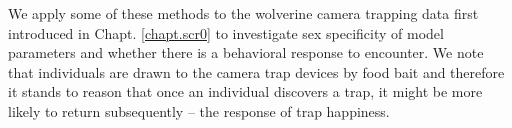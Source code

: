 We apply some of these methods to the wolverine camera trapping
data first introduced in Chapt. \ref{chapt.scr0}
to investigate sex specificity of model parameters and whether
there is a behavioral response to encounter. We note that individuals
are drawn to the camera trap devices by food bait and therefore it
stands to reason that once an individual discovers a trap, it  might
be more likely to return subsequently -- the response of
trap happiness.



\begin{comment}
A basic problem with these two objectives of model selection and model
assessment is their simultaneous use implies a kind of contradiction
which we call the {\it model selectors paradox}: Inferences are always
achieved using standard paradigms of parametric inference (Bayesian or
frequentist) which asssert that the model is properly specified. That
is, we assume that the model is truth. This is paradoxical because we
all know that ``all models are wrong'' but, possibly, ``some are
useful.'' In fact, the notion that an ``assumption'' could even be
correct is itself something of an oxymoron.
\end{comment}
\begin{comment}
  Therefore we don't expect
or hope to make assumptions that are ``correct'' in any way. Gelman
and Shalizi (2010) say it this way: ``there is general agreement that,
in this domain, all models in use are wrong -- not just merely
falsifiable, but actually false.''  We should therefore refrain from
over-stating the relevance of any model.  [not sure where I was going
with this point]
\end{comment}



\begin{comment}
A few specific questions to resolve:
\begin{itemize}
\item[(1)]  Can AIC or DIC choose among detection models and does it matter?
\item[(2)]  Can AIC or DIC choose among more substantial models?  We should
 assume it does. Can we rig up a test?  Suggest: (1) trap level
 covariate and trying DIC; (2) Model Mb vs. not
\item[(3)] Simultaneous to above, see if we can do that.......
Posterior model probabilities: Can we demo this?   With detection models?
 Don't do much analysis of the situation, just demo it maybe?
\item[(4)]  Basic framework for Bayesian GoF. Power under alternatives.
(clustering, regularity, uniformity) and misspecified encounter models
-- do they show a lack of fit?
\end{itemize}
\end{comment}



